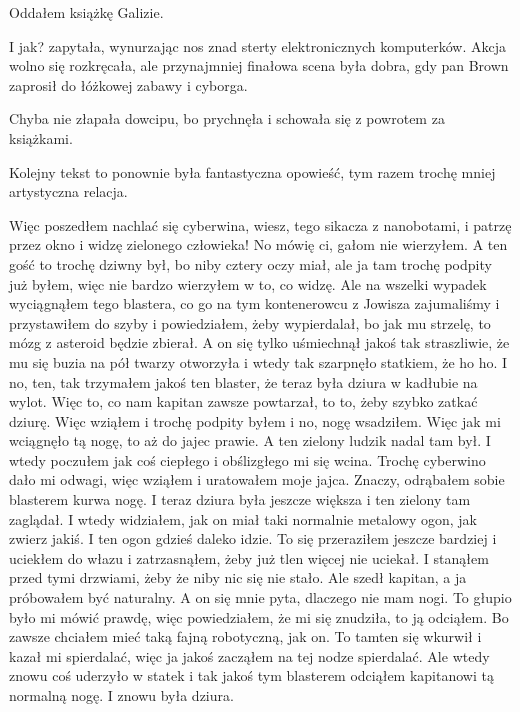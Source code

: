 Oddałem książkę Galizie.

\begin{dialogue}
	\ds{} I jak? \dm{} zapytała, wynurzając nos znad sterty elektronicznych komputerków.
	\ds{} Akcja wolno się rozkręcała, ale przynajmniej finałowa scena była dobra, gdy pan Brown zaprosił do łóżkowej zabawy i cyborga.
\end{dialogue}

Chyba nie złapała dowcipu, bo prychnęła i schowała się z powrotem za książkami.

Kolejny tekst to ponownie była fantastyczna opowieść, tym razem trochę mniej artystyczna relacja.

\begin{poem}
	Więc poszedłem nachlać się cyberwina, wiesz, tego sikacza z nanobotami, i patrzę przez okno i widzę zielonego człowieka!
	No mówię ci, gałom nie wierzyłem. A ten gość to trochę dziwny był, bo niby cztery oczy miał, ale ja tam trochę podpity już byłem, więc nie bardzo wierzyłem w to, co widzę.
	Ale na wszelki wypadek wyciągnąłem tego blastera, co go na tym kontenerowcu z Jowisza zajumaliśmy i przystawiłem do szyby i powiedziałem, żeby wypierdalał, bo jak mu strzelę, to mózg z asteroid będzie zbierał.
	A on się tylko uśmiechnął jakoś tak straszliwie, że mu się buzia na pół twarzy otworzyła i wtedy tak szarpnęło statkiem, że ho ho.
	I no, ten, tak trzymałem jakoś ten blaster, że teraz była dziura w kadłubie na wylot. Więc to, co nam kapitan zawsze powtarzał, to to, żeby szybko zatkać dziurę.
	Więc wziąłem i trochę podpity byłem i no, nogę wsadziłem.
	Więc jak mi wciągnęło tą nogę, to aż do jajec prawie. A ten zielony ludzik nadal tam był. I wtedy poczułem jak coś ciepłego i obślizgłego mi się wcina.
	Trochę cyberwino dało mi odwagi, więc wziąłem i uratowałem moje jajca.
	Znaczy, odrąbałem sobie blasterem kurwa nogę. 
	I teraz dziura była jeszcze większa i ten zielony tam zaglądał.
	I wtedy widziałem, jak on miał taki normalnie metalowy ogon, jak zwierz jakiś. I ten ogon gdzieś daleko idzie.
	To się przeraziłem jeszcze bardziej i uciekłem do włazu i zatrzasnąłem, żeby już tlen więcej nie uciekał.
	I stanąłem przed tymi drzwiami, żeby że niby nic się nie stało. Ale szedł kapitan, a ja próbowałem być naturalny.
	A on się mnie pyta, dlaczego nie mam nogi.
	To głupio było mi mówić prawdę, więc powiedziałem, że mi się znudziła, to ją odciąłem. Bo zawsze chciałem mieć taką fajną robotyczną, jak on.
	To tamten się wkurwił i kazał mi spierdalać, więc ja jakoś zacząłem na tej nodze spierdalać.
	Ale wtedy znowu coś uderzyło w statek i tak jakoś tym blasterem odciąłem kapitanowi tą normalną nogę. I znowu była dziura.

\end{poem}
